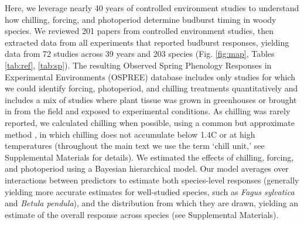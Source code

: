 \documentclass{article}
\begin{document}
\par Here, we leverage nearly 40 years of controlled environment studies to understand how chilling, forcing, and photoperiod determine budburst timing in woody species. %
We reviewed 201 papers from controlled environment studies, then extracted data from all experiments that reported budburst responses, yielding data from 72 studies across 39 years and 203 species (Fig. \ref{fig:map}, Tables \ref{tab:ref}, \ref{tab:sp}). %
The resulting Observed Spring Phenology Responses in Experimental Environments (OSPREE) database includes only studies for which we could identify forcing, photoperiod, and chilling treatments quantitatively and includes a mix of studies where plant tissue was grown in greenhouses or brought in from the field and exposed to experimental conditions. As chilling was rarely reported, we calculated chilling when possible, using a common but approximate method \emph{\citep{richardson1974}}, in which chilling does not accumulate below 1.4\degree C or at high temperatures (throughout the main text we use the term `chill unit,' see Supplemental Materials for details). We estimated the effects of chilling, forcing, and photoperiod using a Bayesian hierarchical model. Our model averages over interactions between predictors to estimate both species-level responses (generally yielding more accurate estimates for well-studied species, such as \emph{Fagus sylvatica} and \emph{Betula pendula}), and the distribution from which they are drawn, yielding an estimate of the overall response across species (see Supplemental Materials).
\end{document}
